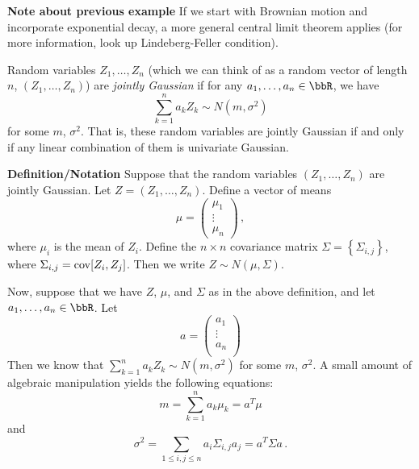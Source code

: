\documentclass[../../../Master/AppliedStochastics.tex]{subfiles}
\author{Fill Staley}
\date{26 September 2018}
\begin{document}
%


\makelecture


\textbf{Note about previous example}
If we start with Brownian motion and incorporate exponential decay,
    a more general central limit theorem applies
    (for more information, look up Lindeberg-Feller condition).


\begin{definition}
    Random variables $Z_1, \dots, Z_n$
        (which we can think of as a random vector of length $n$,
            $(Z_1, \dots, Z_n)$)
    are \emph{jointly Gaussian} if for any $a_1, \dots, a_n \in \bbR$,
    we have
    \begin{equation*}
        \sum_{k = 1}^n a_k Z_k \sim N(m, \sigma^2)
    \end{equation*}
        for some $m$, $\sigma^2$.
    That is, these random variables are jointly Gaussian if and only if
        any linear combination of them is univariate Gaussian.
\end{definition}


\textbf{Definition/Notation}
Suppose that the random variables $(Z_1, \dots, Z_n)$ are jointly Gaussian.
Let $Z=(Z_1, \dots, Z_n)$.
Define a vector of means
\begin{equation*}
    \mu = \left(\begin{array}{ccc}
            \mu_1 \\ \vdots \\ \mu_n
          \end{array}
          \right)\,,
\end{equation*}
    where $\mu_i$ is the mean of $Z_i$.
Define the $n \times n$ covariance matrix
    $\Sigma = \left\{\Sigma_{i, j}\right\}$,
    where $\Sigma_{i, j} = \operatorname{cov}[Z_i, Z_j]$.
Then we write $Z \sim N(\mu, \Sigma)$.


Now, suppose that we have $Z$, $\mu$, and $\Sigma$ as in the above definition,
    and let $a_1, \dots, a_n \in \bbR$.
Let
\begin{equation*}
    a = \left(\begin{array}{c}
        a_1\\ \vdots\\ a_n\\
        \end{array}\right)
\end{equation*}
Then we know that $\displaystyle\sum_{k = 1}^n a_k Z_k \sim N(m, \sigma^2)$
    for some $m$, $\sigma^2$.
A small amount of algebraic manipulation yields the following equations:
\begin{equation*}
    m = \sum_{k = 1}^n a_k \mu_k = a^T \mu
\end{equation*}
    and
\begin{equation*}
    \sigma^2 = \sum_{1\leq i, j\leq n} a_i \Sigma_{i, j} a_j = a^T \Sigma a\,.
\end{equation*}
\end{document}
